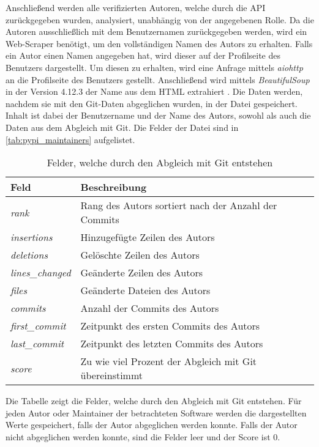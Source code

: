 Anschließend werden alle verifizierten Autoren, welche durch die API zurückgegeben wurden, analysiert, unabhängig von der angegebenen Rolle.
Da die Autoren ausschließlich mit dem Benutzernamen zurückgegeben werden, wird ein Web-Scraper benötigt, um den vollständigen Namen des Autors zu erhalten.
Falls ein Autor einen Namen angegeben hat, wird dieser auf der Profilseite des Benutzers dargestellt.
Um diesen zu erhalten, wird eine Anfrage mittels \emph{aiohttp} an die Profilseite des Benutzers gestellt.
Anschließend wird mittels \emph{BeautifulSoup} in der Version 4.12.3 der Name aus dem HTML extrahiert \autocite{richardson_beautifulsoup4_2024}.
Die Daten werden, nachdem sie mit den Git-Daten abgeglichen wurden, in der Datei  gespeichert.
Inhalt ist dabei der Benutzername und der Name des Autors, sowohl als auch die Daten aus dem Abgleich mit Git.
Die Felder der Datei sind in \autoref{tab:pypi_maintainers} aufgelistet.

\begin{table}
    \centering
    \begin{tabularx}{\textwidth}{XL{10.2cm}}
        \toprule
        \textbf{Feld}         & \textbf{Beschreibung} \\ \midrule
        \emph{rank}           & Rang des Autors sortiert nach der Anzahl der Commits   \\
        \emph{insertions}     & Hinzugefügte Zeilen des Autors                         \\
        \emph{deletions}      & Gelöschte Zeilen des Autors                            \\
        \emph{lines\_changed} & Geänderte Zeilen des Autors                            \\
        \emph{files}          & Geänderte Dateien des Autors                           \\
        \emph{commits}        & Anzahl der Commits des Autors                          \\
        \emph{first\_commit}  & Zeitpunkt des ersten Commits des Autors                \\
        \emph{last\_commit}   & Zeitpunkt des letzten Commits des Autors               \\
        \emph{score}          & Zu wie viel Prozent der Abgleich mit Git übereinstimmt \\
        \bottomrule
    \end{tabularx}
    \caption{Felder, welche durch den Abgleich mit Git entstehen}
    \label{tab:abgleich_felder}
    \small
    \raggedright
    Die Tabelle zeigt die Felder, welche durch den Abgleich mit Git entstehen. Für jeden Autor oder Maintainer der betrachteten Software werden die dargestellten Werte gespeichert, falls der Autor abgeglichen werden konnte. Falls der Autor nicht abgeglichen werden konnte, sind die Felder leer und der Score ist 0.
\end{table}

